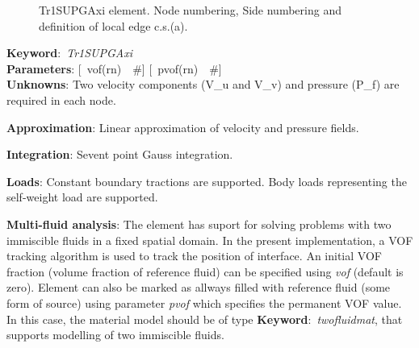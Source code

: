 \documentclass[12pt,dvips]{article}
\newcommand{\descitem}[1]{{\noindent \bf #1}:}
\newcommand{\elemkeyword}[1]{\descitem{Keyword}~{\em #1}}
\newcommand{\elemparam}[2]{{{#1\tiny (#2)}~~\#}}
\newcommand{\optelemparam}[2]{{[~\elemparam{#1}{#2}]}}
\newcommand{\param}[1]{{\it #1}}
\begin{document}
\begin{figure}[tb]
\begin{center}\end{center}
\caption{Tr1SUPGAxi element. Node numbering, Side numbering and
definition of local edge c.s.(a).}
\label{Tr1SUPGAxifig}
\end{figure}

\elemkeyword{Tr1SUPGAxi}\\
\descitem{Parameters} \optelemparam{vof}{rn}
\optelemparam{pvof}{rn}\\
\descitem{Unknowns}
Two velocity components (V\_u and V\_v) and pressure (P\_f) are required in each node.

\descitem{Approximation} Linear approximation of velocity and pressure
fields.

\descitem{Integration}
Sevent point Gauss integration.

\descitem{Loads} Constant boundary tractions are supported. Body loads
representing the self-weight load are supported.

\descitem{Multi-fluid analysis} The element has suport for solving
problems with two immiscible fluids in
a fixed spatial domain. In the present implementation, a VOF tracking algorithm
is used to track the position of interface. An initial VOF fraction
(volume fraction of reference fluid) can be specified using
\param{vof} (default is zero). Element can also be marked as allways
filled with reference fluid (some form of source) using parameter
\param{pvof} which specifies the permanent VOF value. In this case,
the material model should be of type \elemkeyword{twofluidmat}, that
supports modelling of two immiscible fluids.
\end{document}
